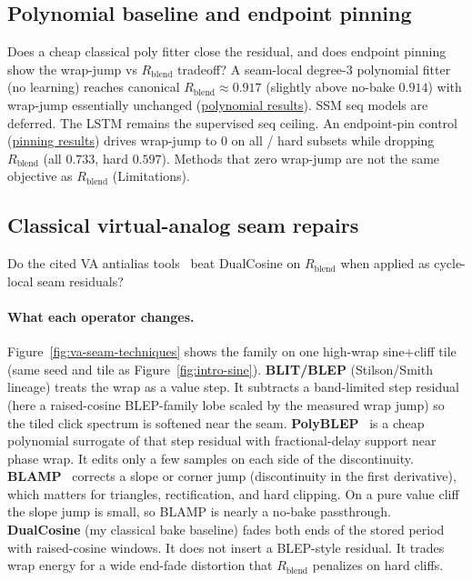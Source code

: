 \subsection{Polynomial baseline and endpoint pinning}
\label{sec:poly-jump}

Does a cheap classical poly fitter close the residual, and does endpoint pinning show the wrap-jump vs $R_{\mathrm{blend}}$ tradeoff?
A seam-local degree-3 polynomial fitter (no learning) reaches canonical $R_{\mathrm{blend}}\approx 0.917$ (slightly above no-bake $0.914$) with wrap-jump essentially unchanged (\href{https://github.com/reeldemo/denoise-opt}{polynomial results}).
SSM seq models are deferred. The LSTM remains the supervised seq ceiling.
An endpoint-pin control (\href{https://github.com/reeldemo/denoise-opt}{pinning results}) drives wrap-jump to $0$ on all / hard subsets while dropping $R_{\mathrm{blend}}$ (all $0.733$, hard $0.597$).
Methods that zero wrap-jump are not the same objective as $R_{\mathrm{blend}}$ (Limitations).

\subsection{Classical virtual-analog seam repairs}
\label{sec:va-seam-baselines}

Do the cited VA antialias tools~\cite{stilson1996,valimaki2007polyblep,esqueda2016blamp} beat DualCosine on $R_{\mathrm{blend}}$ when applied as cycle-local seam residuals?

\paragraph{What each operator changes.}
Figure~\ref{fig:va-seam-techniques} shows the family on one high-wrap sine{+}cliff tile (same seed and tile as Figure~\ref{fig:intro-sine}).
\textbf{BLIT/BLEP} (Stilson/Smith lineage) treats the wrap as a value step.
It subtracts a band-limited step residual (here a raised-cosine BLEP-family lobe scaled by the measured wrap jump) so the tiled click spectrum is softened near the seam.
\textbf{PolyBLEP}~\cite{valimaki2007polyblep} is a cheap polynomial surrogate of that step residual with fractional-delay support near phase wrap.
It edits only a few samples on each side of the discontinuity.
\textbf{BLAMP}~\cite{esqueda2016blamp} corrects a slope or corner jump (discontinuity in the first derivative), which matters for triangles, rectification, and hard clipping.
On a pure value cliff the slope jump is small, so BLAMP is nearly a no-bake passthrough.
\textbf{DualCosine} (my classical bake baseline) fades both ends of the stored period with raised-cosine windows.
It does not insert a BLEP-style residual.
It trades wrap energy for a wide end-fade distortion that $R_{\mathrm{blend}}$ penalizes on hard cliffs.

